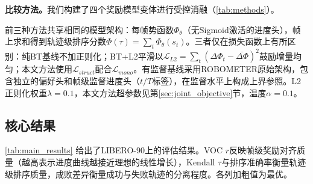 \textbf{比较方法。}我们构建了四个奖励模型变体进行受控消融（\cref{tab:methods}）。

\begin{table}[ht]
    \centering
    \caption{四种比较方法的配置。前三种仅使用成对偏好标签，有监督基线额外使用帧级进度标签，构成监督水平上的上界参照。}
    \label{tab:methods}
\end{table}

前三种方法共享相同的模型架构：每帧势函数$\Phi_\theta$（无Sigmoid激活的进度头），帧上求和得到轨迹级排序分数$\Phi(\tau) = \sum_{t} \Phi_\theta(s_t)$。三者仅在损失函数上有所区别：纯BT基线不加正则化；BT+L2平滑以$\mathcal{L}_{L2} = \sum_t (\Delta\Phi_t - \overline{\Delta\Phi})^2$鼓励增量均匀；本文方法使用$\mathcal{L}_{struct}$配合$\mathcal{L}_{mono}$。有监督基线采用ROBOMETER原始架构，包含独立的偏好头和帧级监督进度头（$t/T$标签），在监督水平上构成上界参照。L2正则化权重$\lambda = 0.1$，本文方法超参数见第\ref{sec:joint_objective}节，温度$\alpha = 0.1$。

\subsection{核心结果}

\cref{tab:main_results} 给出了LIBERO-90上的评估结果。VOC $r$反映帧级奖励对齐质量（越高表示进度曲线越接近理想的线性增长），Kendall $\tau$与排序准确率衡量轨迹级排序质量，成败差异衡量成功与失败轨迹的分离程度。各列加粗值为最优。

